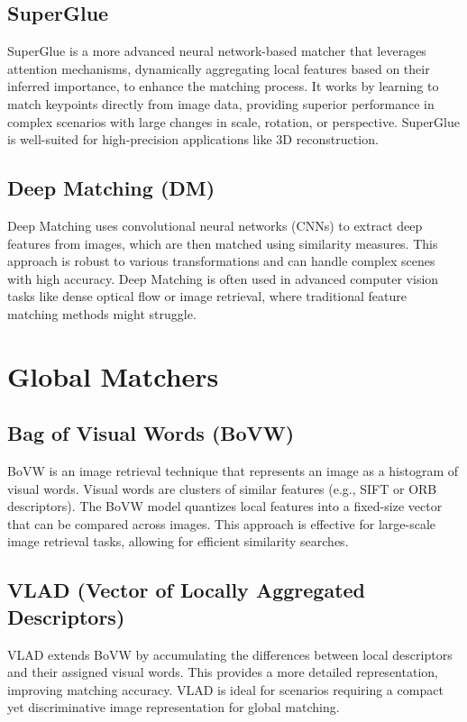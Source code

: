 \subsection*{SuperGlue} SuperGlue is a more advanced neural network-based matcher that leverages attention mechanisms, dynamically aggregating local features based on their inferred importance, to enhance the matching process. It works by learning to match keypoints directly from image data, providing superior performance in complex scenarios with large changes in scale, rotation, or perspective. SuperGlue is well-suited for high-precision applications like 3D reconstruction. 

\subsection*{Deep Matching (DM)} Deep Matching uses convolutional neural networks (CNNs) to extract deep features from images, which are then matched using similarity measures. This approach is robust to various transformations and can handle complex scenes with high accuracy. Deep Matching is often used in advanced computer vision tasks like dense optical flow or image retrieval, where traditional feature matching methods might struggle.


\section*{Global Matchers}
\subsection*{Bag of Visual Words (BoVW)}
BoVW is an image retrieval technique that represents an image as a histogram of visual words. Visual words are clusters of similar features (e.g., SIFT or ORB descriptors). The BoVW model quantizes local features into a fixed-size vector that can be compared across images. This approach is effective for large-scale image retrieval tasks, allowing for efficient similarity searches.

\subsection*{VLAD (Vector of Locally Aggregated Descriptors)}
VLAD extends BoVW by accumulating the differences between local descriptors and their assigned visual words. This provides a more detailed representation, improving matching accuracy. VLAD is ideal for scenarios requiring a compact yet discriminative image representation for global matching.

